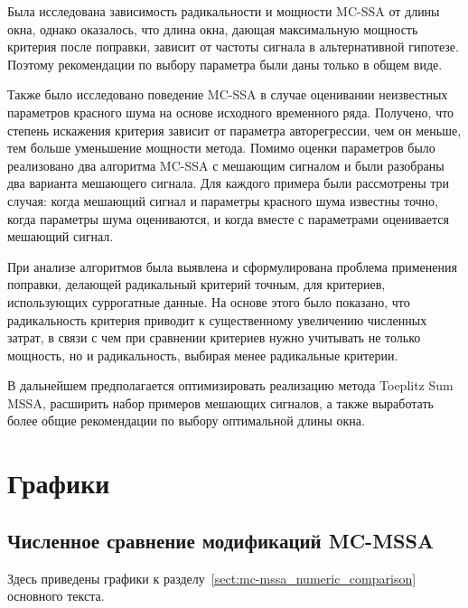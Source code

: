 \documentclass[specialist,
substylefile = spbu_report.rtx,
subf,href,colorlinks=true, 12pt]{disser}
\theoremstyle{definition}
\begin{document}
Была исследована зависимость радикальности и мощности MC-SSA от длины окна, однако оказалось, что длина окна, дающая максимальную мощность критерия после поправки, зависит от частоты сигнала в альтернативной гипотезе. Поэтому рекомендации по выбору параметра были даны только в общем виде.

Также было исследовано поведение MC-SSA в случае оценивании неизвестных параметров красного шума на основе исходного временного ряда. Получено, что степень искажения критерия зависит от параметра авторегрессии, чем он меньше, тем больше уменьшение мощности метода. Помимо оценки параметров было реализовано два алгоритма MC-SSA с мешающим сигналом и были разобраны два варианта мешающего сигнала. Для каждого примера были рассмотрены три случая: когда мешающий сигнал и параметры красного шума известны точно, когда параметры шума оцениваются, и когда вместе с параметрами оценивается мешающий сигнал.

При анализе алгоритмов была выявлена и сформулирована проблема применения поправки, делающей радикальный критерий точным, для критериев, использующих суррогатные данные. На основе этого было показано, что радикальность критерия приводит к существенному увеличению численных затрат, в связи с чем при сравнении критериев нужно учитывать не только мощность, но и радикальность, выбирая менее радикальные критерии.

В дальнейшем предполагается оптимизировать реализацию метода Toeplitz Sum MSSA, расширить набор примеров мешающих сигналов, а также выработать более общие рекомендации по выбору оптимальной длины окна.




\appendix

\chapter{Графики}
\section{Численное сравнение модификаций MC-MSSA}\label{appendix:mc-mssa_graphs}
Здесь приведены графики к разделу~\ref{sect:mc-mssa_numeric_comparison} основного текста.
\end{document}

